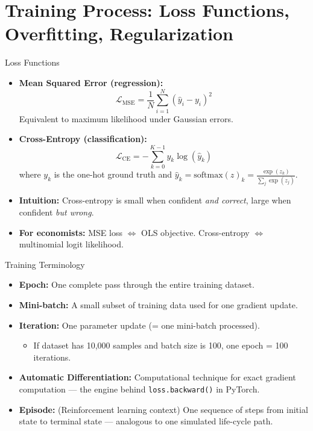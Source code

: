 \documentclass[10pt,english,aspectratio=169]{beamer}
\begin{document}
\section{Training Process: Loss Functions, Overfitting, Regularization}

\begin{frame}{Loss Functions}
\begin{itemize}
\item \textbf{Mean Squared Error (regression):}
\[
\mathcal{L}_{\text{MSE}} = \frac{1}{N}\sum_{i=1}^N (\hat{y}_i - y_i)^2
\]
Equivalent to maximum likelihood under Gaussian errors.

\medskip
\item \textbf{Cross-Entropy (classification):}
\[
\mathcal{L}_{\text{CE}} = -\sum_{k=0}^{K-1} y_k \log(\hat{y}_k)
\]
where $y_k$ is the one-hot ground truth and $\hat{y}_k = \text{softmax}(z)_k = \frac{\exp(z_k)}{\sum_j \exp(z_j)}$.

\medskip
\item \textbf{Intuition:} Cross-entropy is small when confident \emph{and correct}, large when confident \emph{but wrong}.

\medskip
\item \textbf{For economists:} MSE loss $\Leftrightarrow$ OLS objective. Cross-entropy $\Leftrightarrow$ multinomial logit likelihood.
\end{itemize}
\end{frame}

\begin{frame}{Training Terminology}
\begin{itemize}
\item \textbf{Epoch:} One complete pass through the entire training dataset.

\medskip
\item \textbf{Mini-batch:} A small subset of training data used for one gradient update.

\medskip
\item \textbf{Iteration:} One parameter update (= one mini-batch processed).
\begin{itemize}
\item If dataset has 10,000 samples and batch size is 100, one epoch = 100 iterations.
\end{itemize}

\medskip
\item \textbf{Automatic Differentiation:} Computational technique for exact gradient computation --- the engine behind \texttt{loss.backward()} in PyTorch.

\medskip
\item \textbf{Episode:} (Reinforcement learning context) One sequence of steps from initial state to terminal state --- analogous to one simulated life-cycle path.
\end{itemize}
\end{frame}
\end{document}
